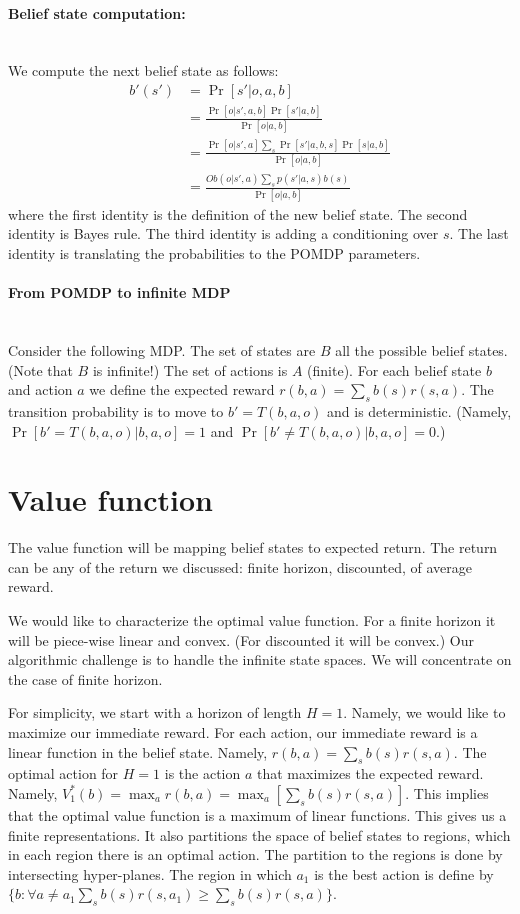 \paragraph{Belief state computation:}\ \\
We compute the next belief state as follows:
\begin{align*}
b'(s') &= \Pr[s'|o,a,b]\\
&= \frac{\Pr[o|s',a,b]\Pr[s'|a,b]}{\Pr[o|a,b]}\\
&= \frac{\Pr[o|s',a]\sum_s \Pr[s'|a,b,s]\Pr[s|a,b]}{\Pr[o|a,b]}\\
&= \frac{Ob(o|s',a)\sum_s p(s'|a,s)b(s)}{\Pr[o|a,b]}
\end{align*}
where the first identity is the definition of the new belief state.
The second identity is Bayes rule. The third identity is adding a
conditioning over $s$. The last identity is translating the
probabilities to the POMDP parameters.

\paragraph{From POMDP to infinite MDP}\ \\
Consider the following MDP. The set of states are $B$ all the
possible belief states. (Note that $B$ is infinite!) The set of
actions is $A$ (finite). For each belief state $b$ and action $a$ we
define the expected reward $r(b,a)=\sum_s b(s)r(s,a)$. The
transition probability is to move to $b'=T(b,a,o)$ and is
deterministic. (Namely, $\Pr[b'=T(b,a,o)|b,a,o]=1$ and $\Pr[b'\neq
T(b,a,o)|b,a,o]=0$.)


\section{Value function}
The value function will be mapping belief states to expected return.
The return can be any of the return we discussed: finite horizon,
discounted, of average reward.

We would like to characterize the optimal value function. For a
finite horizon it will be piece-wise linear and convex. (For
discounted it will be convex.) Our algorithmic challenge is to
handle the infinite state spaces. We will concentrate on the case of
finite horizon.

For simplicity, we start with a horizon of length $H=1$. Namely, we
would like to maximize our immediate reward. For each action, our
immediate reward is a linear function in the belief state. Namely,
$r(b,a)=\sum_s b(s)r(s,a)$. The optimal action for $H=1$ is the
action $a$ that maximizes the expected reward. Namely,
$V^*_1(b)=\max_a r(b,a)=\max_a [\sum_s b(s)r(s,a)]$. This implies
that the optimal value function is a maximum of linear functions.
This gives us a finite representations. It also partitions the space
of belief states to regions, which in each region there is an
optimal action. The partition to the regions is done by intersecting
hyper-planes. The region in which $a_1$ is the best action is define
by $\{b: \forall a\neq a_1 \sum_s b(s)r(s,a_1)\geq \sum_s
b(s)r(s,a)\}$.

